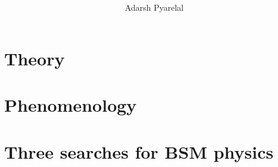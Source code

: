 \documentclass[final,twoside,10pt]{memoir}
\title{\scshape\color{Maroon}{\MakeTextLowercase{Hunting Hidden Higgses}}}
\author{Adarsh Pyarelal}
\date{}
\theoremstyle{definition}
\theoremstyle{theorem}
\begin{document}





\cleardoublepage
\tableofcontents*
\cleardoublepage
\listoffigures*
\cleardoublepage
\listoftables*
\cleardoublepage


\part{Theory}\label{part:Theory}



\part{Phenomenology}\label{Part:Phenomenology}


\part{Three searches for BSM physics}\label{part:Three}



\appendix
\appendixpage

%

%
%
%
\printbibliography

\end{document}
